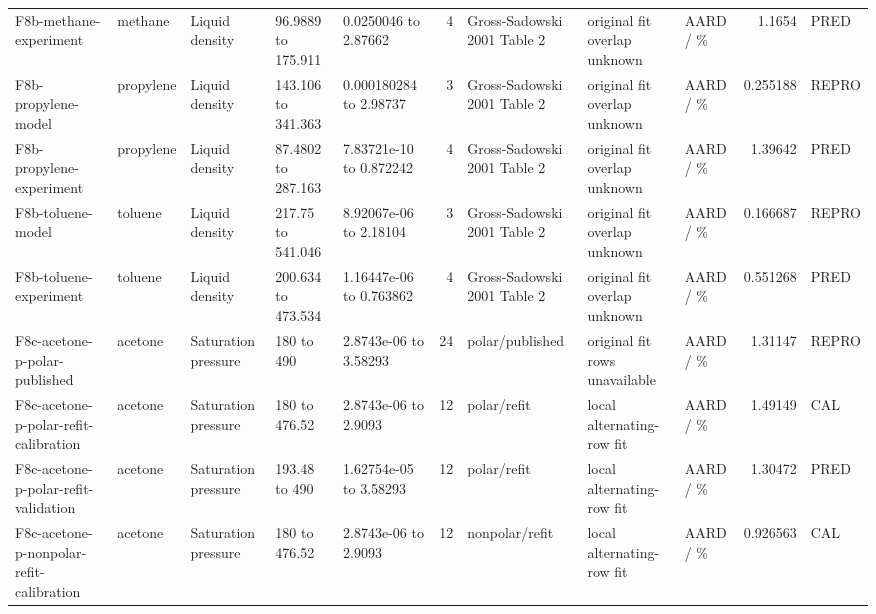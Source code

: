 \begin{landscape}
\begin{longtable}{L{1.9cm}L{2.5cm}L{2.1cm}L{1.6cm}L{1.6cm}rL{2.4cm}L{1.9cm}L{2.2cm}rL{1cm}}
F8b-\allowbreak{}methane-\allowbreak{}experiment & methane & Liquid density & 96.9889 to 175.911 & 0.0250046 to 2.87662 & 4 & Gross-\allowbreak{}Sadowski 2001 Table 2 & original fit overlap unknown & AARD /\allowbreak{} \% & 1.1654 & PRED \\
F8b-\allowbreak{}propylene-\allowbreak{}model & propylene & Liquid density & 143.106 to 341.363 & 0.000180284 to 2.98737 & 3 & Gross-\allowbreak{}Sadowski 2001 Table 2 & original fit overlap unknown & AARD /\allowbreak{} \% & 0.255188 & REPRO \\
F8b-\allowbreak{}propylene-\allowbreak{}experiment & propylene & Liquid density & 87.4802 to 287.163 & 7.83721e-\allowbreak{}10 to 0.872242 & 4 & Gross-\allowbreak{}Sadowski 2001 Table 2 & original fit overlap unknown & AARD /\allowbreak{} \% & 1.39642 & PRED \\
F8b-\allowbreak{}toluene-\allowbreak{}model & toluene & Liquid density & 217.75 to 541.046 & 8.92067e-\allowbreak{}06 to 2.18104 & 3 & Gross-\allowbreak{}Sadowski 2001 Table 2 & original fit overlap unknown & AARD /\allowbreak{} \% & 0.166687 & REPRO \\
F8b-\allowbreak{}toluene-\allowbreak{}experiment & toluene & Liquid density & 200.634 to 473.534 & 1.16447e-\allowbreak{}06 to 0.763862 & 4 & Gross-\allowbreak{}Sadowski 2001 Table 2 & original fit overlap unknown & AARD /\allowbreak{} \% & 0.551268 & PRED \\
F8c-\allowbreak{}acetone-\allowbreak{}p-\allowbreak{}polar-\allowbreak{}published & acetone & Saturation pressure & 180 to 490 & 2.8743e-\allowbreak{}06 to 3.58293 & 24 & polar/\allowbreak{}published & original fit rows unavailable & AARD /\allowbreak{} \% & 1.31147 & REPRO \\
F8c-\allowbreak{}acetone-\allowbreak{}p-\allowbreak{}polar-\allowbreak{}refit-\allowbreak{}calibration & acetone & Saturation pressure & 180 to 476.52 & 2.8743e-\allowbreak{}06 to 2.9093 & 12 & polar/\allowbreak{}refit & local alternating-\allowbreak{}row fit & AARD /\allowbreak{} \% & 1.49149 & CAL \\
F8c-\allowbreak{}acetone-\allowbreak{}p-\allowbreak{}polar-\allowbreak{}refit-\allowbreak{}validation & acetone & Saturation pressure & 193.48 to 490 & 1.62754e-\allowbreak{}05 to 3.58293 & 12 & polar/\allowbreak{}refit & local alternating-\allowbreak{}row fit & AARD /\allowbreak{} \% & 1.30472 & PRED \\
F8c-\allowbreak{}acetone-\allowbreak{}p-\allowbreak{}nonpolar-\allowbreak{}refit-\allowbreak{}calibration & acetone & Saturation pressure & 180 to 476.52 & 2.8743e-\allowbreak{}06 to 2.9093 & 12 & nonpolar/\allowbreak{}refit & local alternating-\allowbreak{}row fit & AARD /\allowbreak{} \% & 0.926563 & CAL \\

\end{longtable}
\end{landscape}
